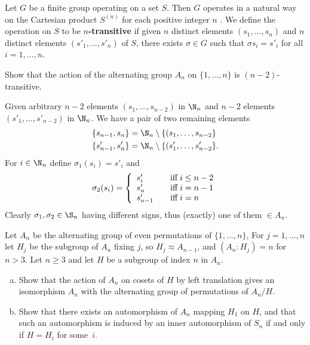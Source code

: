 \documentclass[12pt]{book}
\newcounter{myenumi}
\newenvironment{myenumerate}
{\begin{enumerate}
 \setcounter{enumi}{\themyenumi}
}
{\setcounter{myenumi}{\theenumi}
 \end{enumerate}}
\begin{document}
\begin{myenumerate}
\end{myenumerate}

Let $G$ be a finite group operating on a set $S$.
Then $G$ operates in a natural way on
the Cartesian product \(S^{(n)}\) for each positive integer $n$ .
We define the operation on $S$
to be \hbox{\boldmath$n$\textbf{-transitive}} if given $n$ distinct elements
\((s_1,\ldots,s_n)\) and $n$ distinct elements
\((s'_1,\ldots,s'_n)\) of $S$, there exists \(\sigma\in G\)
such that \(\sigma s_i = s'_i\) for all \(i = 1,\ldots,n\).

\begin{myenumerate}
\begin{excopy}
Show that the action of the alternating group \(A_n\)
on \(\{1,\ldots,n\}\) is \((n - 2)\)-transitive.
\end{excopy}

Given arbitrary
\(n-2\) elements \((s_1,\ldots,s_{n-2})\)  in \(\N_n\)
and
\(n-2\) elements \((s'_1,\ldots,s'_{n-2})\)  in \(\N_n\).
We have a pair of two remaining elements
\begin{eqnarray*}
\{s_{n-1}, s_n\} &= \N_n \setminus \{(s_1,\ldots,s_{n-2}\}\\
\{s'_{n-1}, s'_n\} &= \N_n \setminus \{(s'_1,\ldots,s'_{n-2}\}.
\end{eqnarray*}
For \(i\in\N_n\) define  \(\sigma_1(s_i) = s'_i\) and
\begin{equation*}
  \sigma_2(s_i) =
    \left\{
      \begin{array}{ll}
        s'_i \quad &\textnormal{iff}\; i \leq n - 2 \\
        s'_n \quad &\textnormal{iff}\; i = n - 1 \\
        s'_{n-1} \quad &\textnormal{iff}\; i = n \\
      \end{array}
    \right.
\end{equation*}
Clearly \(\sigma_1,\sigma_2\in\S_n\) having different signs, thus
(exactly) one of them \(\in A_n\).

\begin{excopy}
Let \(A_n\) be the alternating group of even permutations of
\(\{1,\ldots,n\}\), For \(j = 1,\ldots,n\)
let \(H_j\) be the subgroup of \(A_n\) fixing $j$,
so \(H_j \approx A_{n-1}\), and \((A_n: H_j) = n\) for \(n > 3\).
Let \(n \geq 3\) and let $H$ be a subgroup of index $n$ in \(A_n\).
\begin{enumerate}[(a)]
\item
Show that the action of \(A_n\) on cosets of $H$ by left translation
gives an isomorphism \(A_n\) with the alternating group of permutations
of \(A_n/H\).
\item
Show that there exists an automorphism of \(A_n\) mapping \(H_1\) on $H$,
and that
such an automorphism is induced by an inner automorphism of \(S_n\) if and only
if \(H = H_i\) for some~$i$.
\end{enumerate}
\end{excopy}


\end{myenumerate}
\end{document}
